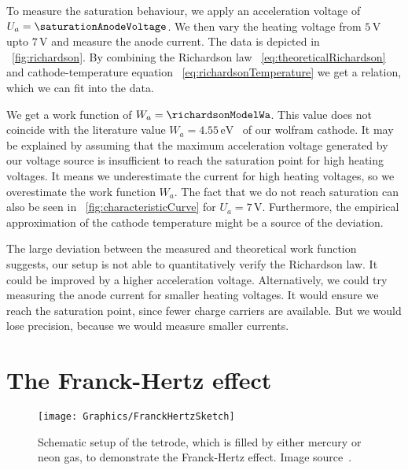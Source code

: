 \documentclass[a4paper,10pt,twocolumn]{article}
\newcommand{\wolframWa}{4.55\, \mathrm{eV}}
\newcommand{\volt}{\, \mathrm{V}}
\newcommand{\sevenV}{7 \volt}
\begin{document}
    To measure the saturation behaviour, we apply an acceleration 
    voltage of $U_a = \saturationAnodeVoltage$.
    We then vary the heating voltage from $5 \volt$ upto $7 \volt$ and measure the anode current.
    The data is depicted in ~\autoref{fig:richardson}.
    By combining the Richardson law ~\eqref{eq:theoreticalRichardson} and 
    cathode-temperature equation ~\eqref{eq:richardsonTemperature} we get a relation,
    which we can fit into the data.
    
    We get a work function of $W_a = \richardsonModelWa$.
    This value does not coincide with the literature value $W_a = \wolframWa$~\cite{wolfram} of our wolfram cathode.
    It may be explained by assuming that the maximum acceleration voltage generated by our voltage source is
    insufficient to reach the saturation point for high heating voltages.
    It means we underestimate the current for high heating voltages, so we overestimate the work function $W_a$.
    The fact that we do not reach saturation can also be seen in ~\autoref{fig:characteristicCurve} for $U_a = \sevenV$.
    Furthermore, the empirical approximation of the cathode temperature might be a source of the deviation.
    
    The large deviation between the measured and theoretical work function suggests, our setup is not able
    to quantitatively verify the Richardson law.
    It could be improved by a higher acceleration voltage. 
    Alternatively, we could try measuring the anode current for smaller heating voltages.
    It would ensure we reach the saturation point, since fewer charge carriers are available.
    But we would lose precision, because we would measure smaller currents.
    
    \section{The Franck-Hertz effect}

    \begin{figure}[htbp]
        \texttt{[image: Graphics/FranckHertzSketch]}
        \center
        \caption{Schematic setup of the tetrode, which is filled by either mercury or neon gas, to demonstrate
        the Franck-Hertz effect.
        Image source~\cite{frankHertzSource}.
        }
        \label{fig:franckHertzSketch}
    \end{figure}
    
\end{document}
